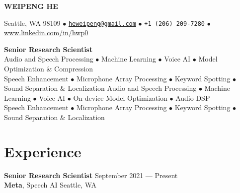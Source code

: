\documentclass[a4paper,9pt]{extarticle} %
\newcommand{\version}{0}
\begin{document}
\thispagestyle{empty}


\begin{center}
  {\Huge\bfseries\sffamily WEIPENG HE}

  Seattle, WA 98109 $\bullet$
  \href{mailto:heweipeng@gmail.com}{\texttt{heweipeng@gmail.com}} $\bullet$
  \texttt{+1 (206) 209-7280} $\bullet$
  \url{www.linkedin.com/in/hwp0}
\end{center}


\begin{center}
  {\LARGE\bfseries\sffamily Senior Research Scientist} \\[4pt]
%
\ifcase\version
\or
  Audio and Speech Processing $\bullet$ Machine Learning $\bullet$ Voice AI $\bullet$ Model Optimization \& Compression \\
  Speech Enhancement $\bullet$ Microphone Array Processing $\bullet$ Keyword Spotting $\bullet$ Sound Separation \& Localization
\else
  Audio and Speech Processing $\bullet$ Machine Learning $\bullet$ Voice AI $\bullet$ On-device Model Optimization $\bullet$ Audio DSP \\
  Speech Enhancement $\bullet$ Microphone Array Processing $\bullet$ Keyword Spotting $\bullet$ Sound Separation \& Localization
\fi
\end{center}


\section{Experience}

\textbf{Senior Research Scientist} \hfill September 2021 --- Present \\
\textbf{Meta}, Speech AI  \hfill Seattle, WA \\
\vspace{-1.5\parskip}
\end{document}
